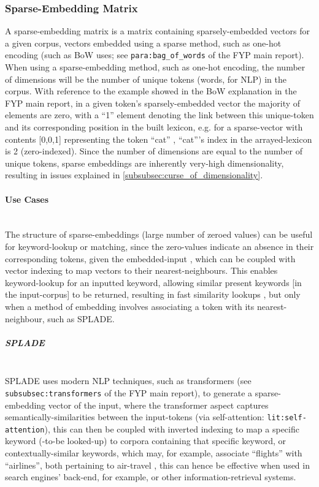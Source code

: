 \subsubsection{Sparse-Embedding Matrix}
A sparse-embedding matrix is a matrix containing sparsely-embedded vectors for a given corpus, vectors embedded using a sparse method, such as one-hot encoding (such as BoW uses; see \verb*|para:bag_of_words| of the FYP main report). When using a sparse-embedding method, such as one-hot encoding, the number of dimensions will be the number of unique tokens (words, for NLP) in the corpus. With reference to the example showed in the BoW explanation in the FYP main report, in a given token's sparsely-embedded vector the majority of elements are zero, with a ``1'' element denoting the link between this unique-token and its corresponding position in the built lexicon, e.g. for a sparse-vector with contents [0,0,1] representing the token ``cat'' , ``cat'''s index in the arrayed-lexicon is 2 (zero-indexed). Since the number of dimensions are equal to the number of unique tokens, sparse embeddings are inherently very-high dimensionality, resulting in issues explained in \cref{subsubsec:curse_of_dimensionality}.
\paragraph{Use Cases}
\noindent\\
The structure of sparse-embeddings (large number of zeroed values) can be useful for keyword-lookup or matching, since the zero-values indicate an absence in their corresponding tokens, given the embedded-input \citep{zilliz:sparse_dense_embeddings}, which can be coupled with vector indexing to map vectors to their nearest-neighbours. This enables keyword-lookup for an inputted keyword, allowing similar present keywords [in the input-corpus] to be returned, resulting in fast similarity lookups \citep{zilliz:vector_indexing}, but only when a method of embedding involves associating a token with its nearest-neighbour, such as SPLADE.
\subparagraph{SPLADE}
\noindent\\
SPLADE uses modern NLP techniques, such as transformers (see \verb*|subsubsec:transformers| of the FYP main report), to generate a sparse-embedding vector of the input, where the transformer aspect captures semantically-similarities between the input-tokens (via self-attention: \verb*|lit:self-attention|), this can then be coupled with inverted indexing to map a specific keyword (-to-be looked-up) to corpora containing that specific keyword, or contextually-similar keywords, which may, for example, associate ``flights'' with ``airlines'', both pertaining to air-travel \citep{pinecone:splade}, this can hence be effective when used in search engines' back-end, for example, or other information-retrieval systems.

